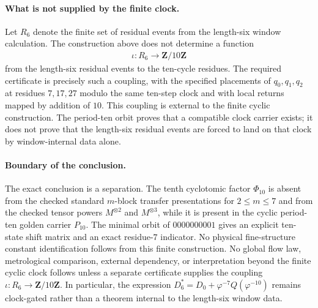 \paragraph{What is not supplied by the finite clock.}
Let $R_6$ denote the finite set of residual events from the length-six window calculation. The construction above does not determine a function
$$
\begin{aligned}
\iota:R_6\longrightarrow \mathbf{Z}/10\mathbf{Z}
\end{aligned}
$$
from the length-six residual events to the ten-cycle residues. The required certificate is precisely such a coupling, with the specified placements of $q_0,q_1,q_2$ at residues $7,17,27$ modulo the same ten-step clock and with local returns mapped by addition of $10$. This coupling is external to the finite cyclic construction. The period-ten orbit proves that a compatible clock carrier exists; it does not prove that the length-six residual events are forced to land on that clock by window-internal data alone.

\paragraph{Boundary of the conclusion.}
The exact conclusion is a separation. The tenth cyclotomic factor $\Phi_{10}$ is absent from the checked standard $m$-block transfer presentations for $2\leq m\leq 7$ and from the checked tensor powers $M^{\otimes 2}$ and $M^{\otimes 3}$, while it is present in the cyclic period-ten golden carrier $P_{10}$. The minimal orbit of $0000000001$ gives an explicit ten-state shift matrix and an exact residue-$7$ indicator. No physical fine-structure constant identification follows from this finite construction. No global flow law, metrological comparison, external dependency, or interpretation beyond the finite cyclic clock follows unless a separate certificate supplies the coupling $\iota:R_6\to \mathbf{Z}/10\mathbf{Z}$. In particular, the expression $D^*_6=D_0+\varphi^{-7}Q(\varphi^{-10})$ remains clock-gated rather than a theorem internal to the length-six window data.
